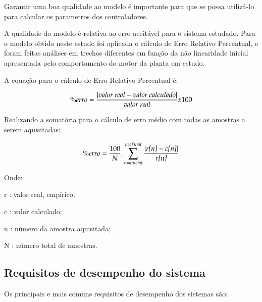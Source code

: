 Garantir uma boa qualidade ao modelo é importante para que se possa
utilizá-lo para calcular os parametros dos controladores.

A qualidade do modelo é relativa ao erro aceitável para o sistema estudado. Para o modelo obtido neste estudo foi aplicada o cálculo de Erro Relativo Percentual, e foram feitas análises em trechos diferentes em função da não linearidade inicial apresentada pelo comportamento do motor da planta em estudo.


A equação para o cálculo de Erro Relativo Percentual é:

\begin{equation}
 \% erro = \frac{| \text{\emph{valor real}} -\text{\emph{valor calculado}} |}{\text{\emph{valor real}}} x 100
\end{equation}

Realizando a somatória para o cálculo de erro médio com todas as
amostras a serem aquisitadas: 

\begin{equation}
 \% erro = \frac{100}{N} . \sum_{n = inicial}^{n = final} {\frac{| \text{\emph{r[n]}} -\text{\emph{c[n]}} |}{\text{\emph{r[n]}}} } 
\end{equation}


Onde:

\setlength{\parindent}{2cm}
r : valor real, empírico; 

c : valor calculado;

n : número da amostra aquisitada;

N : número total de amostras.




\subsection{ Requisitos de desempenho do sistema }

Os principais e mais comuns requisitos de desempenho dos sistemas são:

